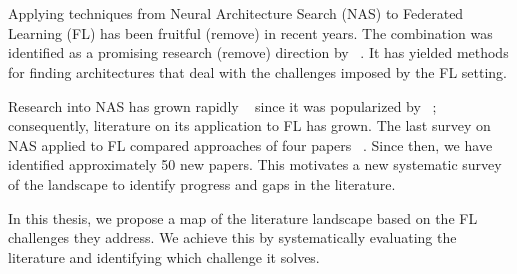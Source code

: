 \chapter{\abstractname}

Applying techniques from Neural Architecture Search (NAS) to Federated Learning (FL) has been fruitful (remove) in recent years. The combination was identified as a promising research (remove) direction by ~\cite{fl_advances_and_open_problems_2021}. It has yielded methods for finding architectures that deal with the challenges imposed by the FL setting.






Research into NAS has grown rapidly ~\cite{nas_1000_papers_2023} since it was popularized by ~\cite{nas_seminal_2017}; consequently, literature on its application to FL has grown. The last survey on NAS applied to FL compared approaches of four papers ~\cite{fl_to_nas_survey_2021}. Since then, we have identified approximately 50 new papers. This motivates a new systematic survey of the landscape to identify progress and gaps in the literature. 

In this thesis, we propose a map of the literature landscape based on the FL challenges they address. We achieve this by systematically evaluating the literature and identifying which challenge it solves. 

